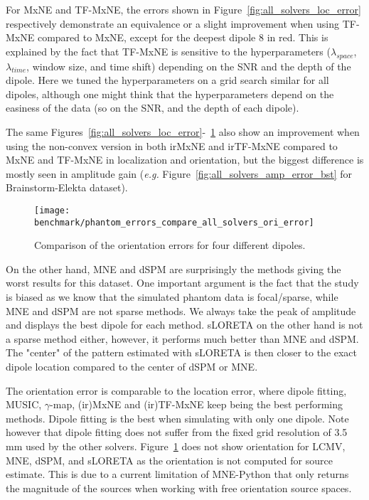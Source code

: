 For MxNE and TF-MxNE, the errors shown in Figure~\ref{fig:all_solvers_loc_error} respectively demonstrate an equivalence or a slight improvement when using TF-MxNE compared to MxNE, except for the deepest dipole 8 in red. This is explained by the fact that TF-MxNE is sensitive to the hyperparameters ($\lambda_{space}$, $\lambda_{time}$, window size, and time shift) depending on the SNR and the depth of the dipole. Here we tuned the hyperparameters on a grid search similar for all dipoles, although one might think that the hyperparameters depend on the easiness of the data (so on the SNR, and the depth of each dipole).

The same Figures~\ref{fig:all_solvers_loc_error}-~\ref{fig:all_solvers_ori_error} also show an improvement when using the non-convex version in both irMxNE and irTF-MxNE compared to MxNE and TF-MxNE in localization and orientation, but the biggest difference is mostly seen in amplitude gain (\textit{e.g.} Figure~\ref{fig:all_solvers_amp_error_bst} for Brainstorm-Elekta dataset).

\begin{figure}[th]
	\centering 
    \texttt{[image: benchmark/phantom\_errors\_compare\_all\_solvers\_ori\_error]}
    \caption{Comparison of the orientation errors for four different dipoles. \label{fig:all_solvers_ori_error}}
\end{figure}

On the other hand, MNE and dSPM are surprisingly the methods giving the worst results for this dataset. One important argument is the fact that the study is biased as we know that the simulated phantom data is focal/sparse, while MNE and dSPM are not sparse methods. We always take the peak of amplitude and displays the best dipole for each method. sLORETA on the other hand is not a sparse method either, however, it performs much better than MNE and dSPM. The "center" of the pattern estimated with sLORETA is then closer to the exact dipole location compared to the center of dSPM or MNE.

The orientation error is comparable to the location error, where dipole fitting, MUSIC, $\gamma$-map, (ir)MxNE and (ir)TF-MxNE keep being the best performing methods. Dipole fitting is the best when simulating with only one dipole. Note however that dipole fitting does not suffer from the fixed grid resolution of 3.5\,mm used by the other solvers.
Figure~\ref{fig:all_solvers_ori_error} does not show orientation for LCMV, MNE, dSPM, and sLORETA as the orientation is not computed for source estimate. This is due to a current limitation of MNE-Python that only returns the magnitude of the sources when working with free orientation source spaces.

